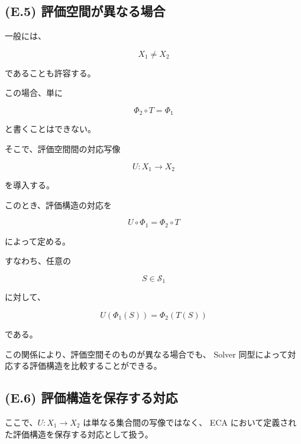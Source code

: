 \documentclass[a4paper,11pt]{article}
\newcommand{\Solver}{\mathcal{S}}
\begin{document}
\subsection{(E.5) 評価空間が異なる場合}
\label{subsec:E5}

一般には、

\begin{equation}
    X_1\neq X_2
\end{equation}

であることも許容する。

この場合、単に

\begin{equation}
    \Phi_2\circ T=\Phi_1
\end{equation}

と書くことはできない。

そこで、評価空間間の対応写像

\begin{equation}
    U:
    X_1
    \longrightarrow
    X_2
\end{equation}

を導入する。

このとき、評価構造の対応を

\begin{equation}
    \boxed{
        U\circ\Phi_1
        =
        \Phi_2\circ T
    }
    \label{eq:E-evaluation-space-commutativity}
\end{equation}

によって定める。

すなわち、任意の

\begin{equation}
    S\in\Solver_1
\end{equation}

に対して、

\begin{equation}
    U(\Phi_1(S))
    =
    \Phi_2(T(S))
\end{equation}

である。

この関係により、評価空間そのものが異なる場合でも、
Solver 同型によって対応する評価構造を比較することができる。


\subsection{(E.6) 評価構造を保存する対応}
\label{subsec:E6}

ここで、$U:X_1\to X_2$ は単なる集合間の写像ではなく、
ECA において定義された評価構造を保存する対応として扱う。
\end{document}

